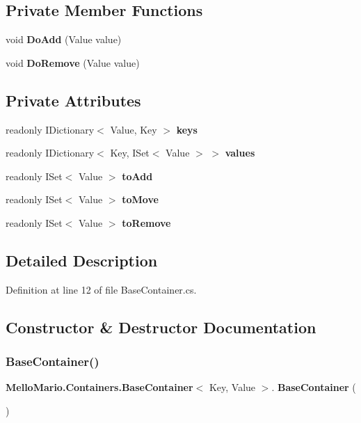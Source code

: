 \subsection*{Private Member Functions}
\begin{DoxyCompactItemize}
\item 
void \textbf{ Do\+Add} (Value value)
\item 
void \textbf{ Do\+Remove} (Value value)
\end{DoxyCompactItemize}
\subsection*{Private Attributes}
\begin{DoxyCompactItemize}
\item 
readonly I\+Dictionary$<$ Value, Key $>$ \textbf{ keys}
\item 
readonly I\+Dictionary$<$ Key, I\+Set$<$ Value $>$ $>$ \textbf{ values}
\item 
readonly I\+Set$<$ Value $>$ \textbf{ to\+Add}
\item 
readonly I\+Set$<$ Value $>$ \textbf{ to\+Move}
\item 
readonly I\+Set$<$ Value $>$ \textbf{ to\+Remove}
\end{DoxyCompactItemize}


\subsection{Detailed Description}


Definition at line 12 of file Base\+Container.\+cs.



\subsection{Constructor \& Destructor Documentation}
\mbox{\label{classMelloMario_1_1Containers_1_1BaseContainer_a3d356d93d9ad13722011b101d6648ad1}} 
\subsubsection{Base\+Container()}
{\footnotesize\ttfamily \textbf{ Mello\+Mario.\+Containers.\+Base\+Container}$<$ Key, Value $>$.\textbf{ Base\+Container} (\begin{DoxyParamCaption}{ }\end{DoxyParamCaption})\hspace{0.3cm}{\ttfamily [protected]}}



